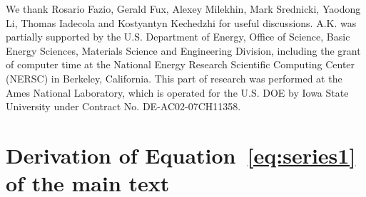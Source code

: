 \documentclass[%
 reprint,
 superscriptaddress,
 amsmath,amssymb,
prx,
]{revtex4-2}\href{\href{}{}}{}
\begin{document}
\begin{acknowledgments}

We thank Rosario Fazio, Gerald Fux, Alexey Milekhin, Mark Srednicki, Yaodong Li, Thomas Iadecola and Kostyantyn Kechedzhi for useful discussions. A.K. was partially supported by the U.S. Department of Energy, Office of Science, Basic Energy Sciences, Materials Science and Engineering Division, including the grant of computer time at the National Energy Research Scientific Computing Center (NERSC) in Berkeley, California. This part of research was performed at the Ames National Laboratory, which is operated for the U.S. DOE by Iowa State University under Contract No. DE-AC02-07CH11358.


\end{acknowledgments}






\onecolumngrid

\appendix


\section{\label{sec:App_Eq_27}Derivation of Equation~\eqref{eq:series1} of the main text}
\end{document}
